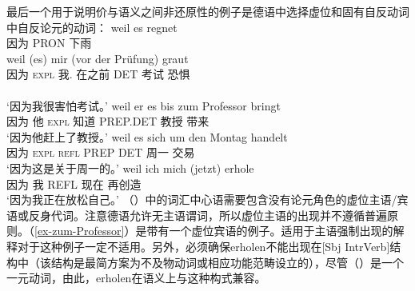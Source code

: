 \begin{exe}
\begin{xlist}[iv.]
\begin{exe}
\begin{xlist}[iv.]
最后一个用于说明价与语义之间非还原性的例子是德语中选择虚位和固有自反动词中自反论元的动词：
\eal
\ex 
\gll weil es regnet\\
     因为 PRON 下雨\\
\ex 
\gll weil (es) mir (vor der Prüfung) graut\\
     因为 \textsc{expl} 我.\dat{} 在之前 DET 考试 恐惧\\\\
\glt `因为我很害怕考试。'
\ex\label{ex-zum-Professor}
\gll weil er es bis zum Professor bringt\\
     因为 他 \textsc{expl} 知道 PREP.DET 教授 带来\\
\glt `因为他赶上了教授。'
\ex 
\gll weil es sich um den Montag handelt\\
     因为 \textsc{expl} \textsc{refl} PREP DET 周一 交易\\
\glt `因为这是关于周一的。'
\ex 
\gll weil ich mich (jetzt) erhole\\
     因为 我 REFL 现在 再创造\\
\glt `因为我正在放松自己。'
\zl
（）中的词汇中心语需要包含没有论元角色的虚位主语/宾语或反身代词。注意德语允许无主语谓词，所以虚位主语的出现并不遵循普遍原则。（\ref{ex-zum-Professor}）是带有一个虚位宾语的例子。适用于主语强制出现的解释对于这种例子一定不适用。另外，必须确保erholen不能出现在[Sbj IntrVerb]结构中（该结构是最简方案为不及物动词或相应功能范畴设立的），尽管（）是一个一元动词，由此，erholen在语义上与这种构式兼容。

\end{xlist}
\end{exe}
\end{xlist}
\end{exe}
